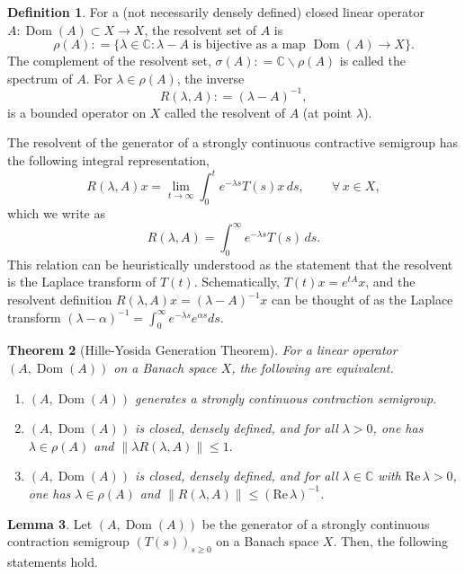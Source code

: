 \documentclass[11pt,a4paper]{article}
\theoremstyle{plain}
\newtheorem{theorem}{Theorem}
\numberwithin{theorem}{section}
\theoremstyle{definition}
\newtheorem{definition}[theorem]{Definition}
\newtheorem{lemma}[theorem]{Lemma}
\newcommand{\?}{\overset{?}{=}}
\newcommand{\defeq}{\mathrel{\mathop:}=}
\newcommand{\A}{\,\forall\,}
\newcommand{\C}{\mathbb{C}}
\newcommand{\I}{\infty}
\renewcommand{\a}{\alpha}	%
\renewcommand{\l}{\lambda}	%
\renewcommand{\r}{\rho}		%
\newcommand{\s}{\sigma}
\DeclareMathOperator{\Dom}{Dom}
\begin{document}
\begin{appendix}
\begin{definition}\label{def:resolvent-appendix}
For a (not necessarily densely defined) closed linear operator $A:\Dom(A)\subset X\to X$, the resolvent set of $A$ is
\begin{equation}
    \r(A)\defeq \{\l\in\C:\l-A \text{ is bijective as a map }\Dom(A)\to X \}.
\end{equation}
The complement of the resolvent set, $\s(A)\defeq\C\backslash\r(A)$ is called the spectrum of $A$. For $\l\in\r(A)$, the inverse
\begin{equation}
    R(\l,A)\defeq (\l-A)^{-1},
\end{equation}
is a bounded operator on $X$ called the resolvent of $A$ (at point $\l$).
\end{definition}
The resolvent of the generator of a strongly continuous contractive semigroup has the following integral representation,
\begin{equation}
    R(\l,A)x = \lim_{t\to\I}\int_0^t e^{-\l s}T(s)x\,ds, \qquad \A x\in X,
\end{equation}
which we write as
\begin{equation}
    R(\l,A) = \int_0^\I e^{-\l s}T(s)\,ds.
\end{equation}
This relation can be heuristically understood as the statement that the resolvent is the Laplace transform of $T(t)$. Schematically, $T(t)x=e^{tA}x$, and the resolvent definition $R(\l,A)x= (\l-A)^{-1}x$ can be thought of as the Laplace transform $(\l-\a)^{-1}= \int_0^\I e^{-\l s}e^{\a s}ds$. \cite{hille1981functional}
\begin{theorem}[Hille-Yosida Generation Theorem]\label{thm:hille-yosida}
For a linear operator $(A,\Dom(A))$ on a Banach space $X$, the following are equivalent.
\begin{enumerate}
    \item $(A,\Dom(A))$ generates a strongly continuous contraction semigroup.
    \item $(A,\Dom(A))$ is closed, densely defined, and for all $\l>0$, one has $\l\in\r(A)$ and $\|\l R(\l,A)\|\leq 1.$
    \item $(A,\Dom(A))$ is closed, densely defined, and for all $\l\in\C$ with $\mathrm{Re}\,\l>0$, one has $\l\in\r(A)$ and $\|R(\l,A)\|\leq (\mathrm{Re}\,\l)^{-1}$.
\end{enumerate}
\end{theorem}
\begin{lemma}\label{lem:resolvent-convergence}
Let $(A,\Dom(A))$ be the generator of a strongly continuous contraction semigroup $(T(s))_{s\geq0}$ on a Banach space $X$. Then, the following statements hold.

\end{lemma}
\end{appendix}
\end{document}
